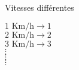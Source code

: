 \documentclass[12pt]{beamer}
\begin{document}
\begin{frame}{Vitesses différentes}
    \begin{center}
    
        $\text{1 Km/h} \longrightarrow 1$\\
        \vspace{0.5cm}
        $\text{2 Km/h} \longrightarrow 2$\\
        \vspace{0.5cm}
        $\text{3 Km/h} \longrightarrow 3$\\
        \Huge $\vdots$\\
        \Huge $\vdots$\\
        \Huge $\vdots$\\
    \end{center}
\end{frame}
\end{document}
